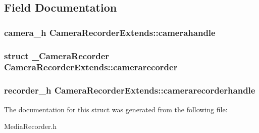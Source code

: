 \subsection{Field Documentation}
\subsubsection[{camerahandle}]{\setlength{\rightskip}{0pt plus 5cm}camera\-\_\-h Camera\-Recorder\-Extends\-::camerahandle}\label{structCameraRecorderExtends_a726c50cc1369f844d7453fb10ca31c0f}
\subsubsection[{camerarecorder}]{\setlength{\rightskip}{0pt plus 5cm}struct {\bf \-\_\-\-Camera\-Recorder} Camera\-Recorder\-Extends\-::camerarecorder}\label{structCameraRecorderExtends_a345628ad5fbaeb862a916d152a9fdfe3}
\subsubsection[{camerarecorderhandle}]{\setlength{\rightskip}{0pt plus 5cm}recorder\-\_\-h Camera\-Recorder\-Extends\-::camerarecorderhandle}\label{structCameraRecorderExtends_a9cb2d9772a936cf1336d903ba1593811}


The documentation for this struct was generated from the following file\-:\begin{DoxyCompactItemize}
\item 
Media\-Recorder.\-h\end{DoxyCompactItemize}

